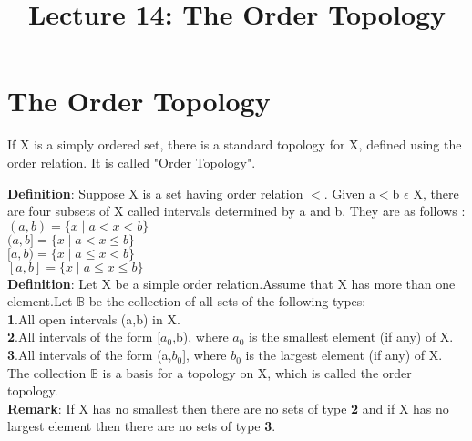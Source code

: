 \documentclass[a4paper,english,12pt]{article}
\title{\bf Lecture 14: The Order Topology}
\author{}
\begin{document}
\maketitle
\section{The Order Topology}
If X is a simply ordered set, there is a standard topology for X, defined using the order relation. It is called "Order Topology".\\
\begin{flushleft}
{\bf Definition}: Suppose X is a set having order relation $<$. Given a$<$b $\epsilon$ X, there are four subsets of X called intervals determined by a and b. They are as follows :\\
$(a,b)=\{x\mid a<x<b\}$\\
$(a,b]=\{x\mid a<x\leq b\}$\\
$[a,b)=\{x\mid a\leq x<b\}$\\
$[a,b]=\{x\mid a\leq x\leq b\}$\\
\vspace{2mm}
{\bf Definition}: Let X be a simple order relation.Assume that X has more than one element.Let $\mathbb{B}$ be the collection of all sets of the following types:\\
\vspace{2mm}
{\bf 1}.All open intervals (a,b) in X.\\
{\bf 2}.All intervals of the form [$a_0$,b), where $a_0$ is the smallest element (if any) of X.\\
{\bf 3}.All intervals of the form (a,$b_0$], where $b_0$ is the largest element (if any) of X.\\
\vspace{2mm}
The collection $\mathbb{B}$ is a basis for a topology on X, which is called the order topology.\\
\vspace{1mm}
{\bf Remark}: If X has no smallest then there are no sets of type {\bf 2} and if X has no largest element then there are no sets of type {\bf 3}.


\end{flushleft}
\end{document}
